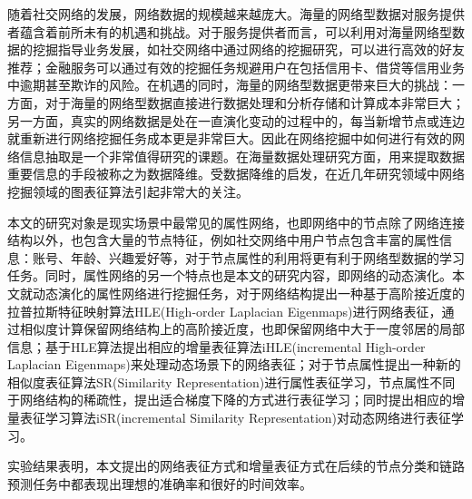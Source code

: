 随着社交网络的发展，网络数据的规模越来越庞大。海量的网络型数据对服务提供者蕴含着前所未有的机遇和挑战。对于服务提供者而言，可以利用对海量网络型数据的挖掘指导业务发展，如社交网络中通过网络的挖掘研究，可以进行高效的好友推荐；金融服务可以通过有效的挖掘任务规避用户在包括信用卡、借贷等信用业务中逾期甚至欺诈的风险。在机遇的同时，海量的网络型数据更带来巨大的挑战：一方面，对于海量的网络型数据直接进行数据处理和分析存储和计算成本非常巨大；另一方面，真实的网络数据是处在一直演化变动的过程中的，每当新增节点或连边就重新进行网络挖掘任务成本更是非常巨大。因此在网络挖掘中如何进行有效的网络信息抽取是一个非常值得研究的课题。在海量数据处理研究方面，用来提取数据重要信息的手段被称之为数据降维。受数据降维的启发，在近几年研究领域中网络挖掘领域的图表征算法引起非常大的关注。

本文的研究对象是现实场景中最常见的属性网络，也即网络中的节点除了网络连接结构以外，也包含大量的节点特征，例如社交网络中用户节点包含丰富的属性信息：账号、年龄、兴趣爱好等，对于节点属性的利用将更有利于网络型数据的学习任务。同时，属性网络的另一个特点也是本文的研究内容，即网络的动态演化。本文就动态演化的属性网络进行挖掘任务，对于网络结构提出一种基于高阶接近度的拉普拉斯特征映射算法HLE(High-order Laplacian Eigenmaps)进行网络表征，通过相似度计算保留网络结构上的高阶接近度，也即保留网络中大于一度邻居的局部信息；基于HLE算法提出相应的增量表征算法iHLE(incremental High-order Laplacian Eigenmaps)来处理动态场景下的网络表征；对于节点属性提出一种新的相似度表征算法SR(Similarity Representation)进行属性表征学习，节点属性不同于网络结构的稀疏性，提出适合梯度下降的方式进行表征学习；同时提出相应的增量表征学习算法iSR(incremental Similarity Representation)对动态网络进行表征学习。

实验结果表明，本文提出的网络表征方式和增量表征方式在后续的节点分类和链路预测任务中都表现出理想的准确率和很好的时间效率。